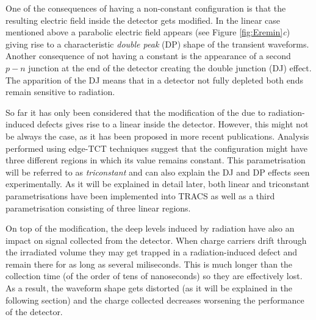 
One of the consequences of having a non-constant \neff configuration is that the resulting electric field inside the detector gets modified. In the linear case mentioned above a parabolic electric field appears (see Figure \ref{fig:Eremin}\emph{c}) giving rise to a characteristic \emph{double peak} (DP) shape of the transient waveforms. Another consequence of not having a constant \neff is the appearance of a second $p-n$ junction at the end of the detector creating the double junction (DJ) effect. The apparition of the DJ means that in a detector not fully depleted both ends remain sensitive to radiation.



So far it has only been considered that the modification of the \neff due to radiation-induced defects gives rise to a linear \neff inside the detector. However, this might not be always the case, as it has been proposed in more recent publications\cite{KramVertex}. Analysis performed using edge-TCT techniques suggest that the \neff configuration might have three different regions in which its value remains constant. This parametrisation will be referred to as \emph{triconstant} and can also explain the DJ and DP effects seen experimentally. As it will be explained in detail later, both linear and triconstant parametrisations have been implemented into TRACS as well as a third parametrisation consisting of three linear regions.  

On top of the \neff modification, the deep levels induced by radiation have also an impact on signal collected from the detector. When charge carriers drift through the irradiated volume they may get trapped in a radiation-induced defect and remain there for as long as several miliseconds. This is much longer than the collection time (of the order of tens of nanoseconds) so they are effectively lost. As a result, the waveform shape gets distorted (as it will be explained in the following section) and the charge collected decreases worsening the performance of the detector.

